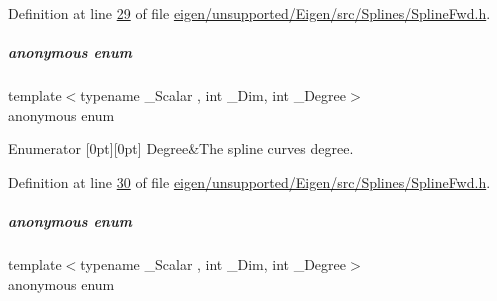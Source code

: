 Definition at line \hyperlink{eigen_2unsupported_2_eigen_2src_2_splines_2_spline_fwd_8h_source_l00029}{29} of file \hyperlink{eigen_2unsupported_2_eigen_2src_2_splines_2_spline_fwd_8h_source}{eigen/unsupported/\+Eigen/src/\+Splines/\+Spline\+Fwd.\+h}.

\mbox{\label{group___splines___module_a6ae25956f7d76aae573d5613e57fd9d5}} 
\subparagraph{\texorpdfstring{anonymous enum}{anonymous enum}}
{\footnotesize\ttfamily template$<$typename \+\_\+\+Scalar , int \+\_\+\+Dim, int \+\_\+\+Degree$>$ \\
anonymous enum}

\begin{DoxyEnumFields}{Enumerator}
[0pt][0pt]{}\mbox{\label{group___splines___module_a2e06443a908d1ebf9cc91d4fa3fe5c5aaec1dae8e0ed3ac7304e02009d428330a}} 
Degree&The spline curve\textquotesingle{}s degree. \\
\hline

\end{DoxyEnumFields}


Definition at line \hyperlink{eigen_2unsupported_2_eigen_2src_2_splines_2_spline_fwd_8h_source_l00030}{30} of file \hyperlink{eigen_2unsupported_2_eigen_2src_2_splines_2_spline_fwd_8h_source}{eigen/unsupported/\+Eigen/src/\+Splines/\+Spline\+Fwd.\+h}.

\mbox{\label{group___splines___module_ac6e674917cb14e519272285620f8cd32}} 
\subparagraph{\texorpdfstring{anonymous enum}{anonymous enum}}
{\footnotesize\ttfamily template$<$typename \+\_\+\+Scalar , int \+\_\+\+Dim, int \+\_\+\+Degree$>$ \\
anonymous enum}

